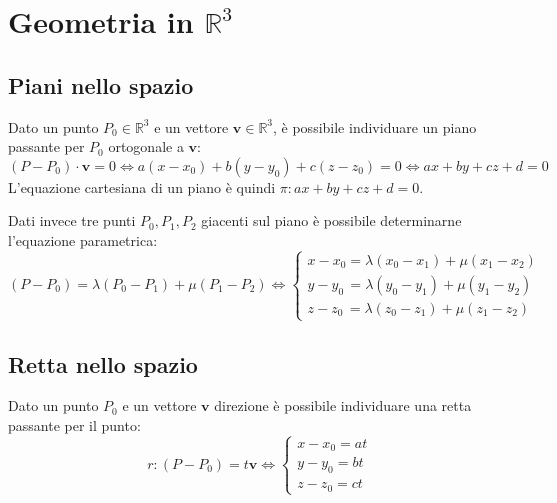 \documentclass{article}
\begin{document}
\setlength{\parindent}{0pt}

\section{Geometria in $\mathbb{R}^3$}
\subsection{Piani nello spazio}
    Dato un punto $P_0 \in \mathbb{R}^3$ e un vettore $\mathbf{v} \in \mathbb{R}^3$, è possibile individuare un piano passante per $P_0$ ortogonale a $\mathbf{v}$:
    \[
        (P - P_0) \cdot \mathbf{v} = 0 \iff a(x - x_0) + b(y - y_0) + c(z - z_0) = 0 \iff ax + by + cz + d = 0
    \] 
    L'equazione cartesiana di un piano è quindi $\pi: ax + by + cz + d = 0$.

    \vspace{10pt}
    Dati invece tre punti $P_0, P_1, P_2$ giacenti sul piano è possibile determinarne l'equazione parametrica:
    \[
        (P - P_0) = \lambda(P_0 - P_1) + \mu(P_1 - P_2) \iff 
        \begin{cases}
            x - x_0 = \lambda(x_0 - x_1) + \mu(x_1 - x_2) \\
            y - y_0 \, = \lambda(y_0 - y_1) + \mu(y_1 - y_2) \\
            z - z_0 \, = \lambda(z_0 - z_1) + \mu(z_1 - z_2)
        \end{cases}  
    \]



\subsection{Retta nello spazio}
    Dato un punto $P_0$ e un vettore $\mathbf{v}$ direzione è possibile individuare una retta passante per il punto:
    \[
        r: (P - P_0) = t\mathbf{v} \iff 
        \begin{cases}
            x - x_0 = a t \\
            y - y_0 = b t \\
            z - z_0 = c t 
        \end{cases}
    \]
\end{document}
